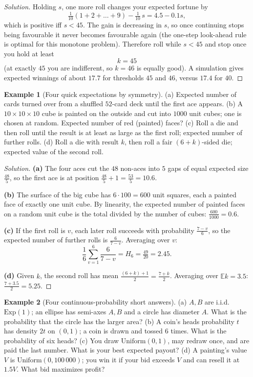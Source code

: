 \documentclass[11pt]{article}
\theoremstyle{definition}
\newtheorem{example}{Example}[section]
\newcommand{\E}{\mathbb{E}}
\begin{document}
\begin{proof}[Solution]
Holding $s$, one more roll changes your expected fortune by
\[
\tfrac1{10}(1+2+\dots+9)-\tfrac1{10}\,s=4.5-0.1s ,
\]
which is positive iff $s<45$. The gain is decreasing in $s$, so once continuing stops being favourable it never becomes favourable again (the one-step look-ahead rule is optimal for this monotone problem). Therefore roll while $s<45$ and stop once you hold at least
\[
\boxed{k=45}
\]
(at exactly $45$ you are indifferent, so $k=46$ is equally good). A simulation gives expected winnings of about $17.7$ for thresholds $45$ and $46$, versus $17.4$ for $40$.
\end{proof}

\begin{example}[Four quick expectations by symmetry]
(a) Expected number of cards turned over from a shuffled $52$-card deck until the first ace appears. (b) A $10\times10\times10$ cube is painted on the outside and cut into $1000$ unit cubes; one is chosen at random. Expected number of red (painted) faces? (c) Roll a die and then roll until the result is at least as large as the first roll; expected number of further rolls. (d) Roll a die with result $k$, then roll a fair $(6+k)$-sided die; expected value of the second roll.
\end{example}

\begin{proof}[Solution]
\textbf{(a)} The four aces cut the $48$ non-aces into $5$ gaps of equal expected size $\tfrac{48}5$, so the first ace is at position $\tfrac{48}5+1=\boxed{\tfrac{53}5=10.6}$.

\textbf{(b)} The surface of the big cube has $6\cdot100=600$ unit squares, each a painted face of exactly one unit cube. By linearity, the expected number of painted faces on a random unit cube is the total divided by the number of cubes: $\tfrac{600}{1000}=\boxed{0.6}$.

\textbf{(c)} If the first roll is $v$, each later roll succeeds with probability $\tfrac{7-v}6$, so the expected number of further rolls is $\tfrac6{7-v}$. Averaging over $v$:
\[
\frac16\sum_{v=1}^6\frac6{7-v}=H_6=\boxed{\tfrac{49}{20}=2.45}.
\]

\textbf{(d)} Given $k$, the second roll has mean $\tfrac{(6+k)+1}2=\tfrac{7+k}2$. Averaging over $\E k=3.5$: $\tfrac{7+3.5}2=\boxed{5.25}$.
\end{proof}

\begin{example}[Four continuous-probability short answers]
(a) $A,B$ are i.i.d.\ $\mathrm{Exp}(1)$; an ellipse has semi-axes $A,B$ and a circle has diameter $A$. What is the probability that the circle has the larger area? (b) A coin's heads probability $t$ has density $2t$ on $(0,1)$; a coin is drawn and tossed $6$ times. What is the probability of six heads? (c) You draw $\mathrm{Uniform}(0,1)$, may redraw once, and are paid the last number. What is your best expected payout? (d) A painting's value $V$ is $\mathrm{Uniform}(0,100\,000)$; you win it if your bid exceeds $V$ and can resell it at $1.5V$. What bid maximizes profit?
\end{example}
\end{document}

